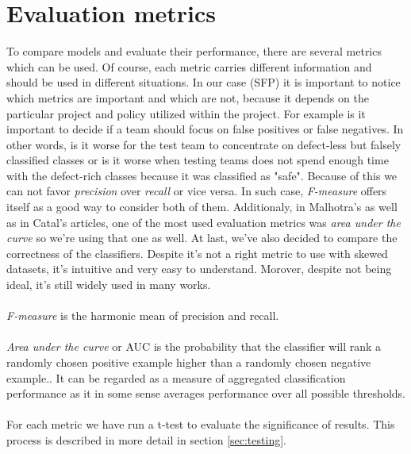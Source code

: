 \section{Evaluation metrics}
To compare models and evaluate their performance, there are several metrics which can be used. Of course, each metric carries different information and should be used in different situations. In our case (SFP) it is important to notice which metrics are important and which are not, because it depends on the particular project and policy utilized within the project.
For example is it important to decide if a team should focus on false positives or false negatives. In other words, is it worse for the test team to concentrate on defect-less but falsely classified classes or is it worse when testing teams does not spend enough time with the defect-rich classes because it was classified as "safe". Because of this we can not favor \textit{precision} over \textit{recall} or vice versa. In such case, \textit{F-measure} offers itself as a good way to consider both of them. Additionaly, in Malhotra's \cite{malhotra2015systematic} as well as in Catal's\cite{catal2012performance} articles, one of the most used evaluation metrics was \textit{area under the curve} so we're using that one as well. At last, we've also decided to compare the correctness of the classifiers. Despite it's not a right metric to use\cite{sankar2014prediction,catal2012performance} with skewed datasets, it's intuitive and very easy to understand. Morover, despite not being ideal, it's still widely used in many works\cite{sahana2013software,prasad2015study,sharma2016software}. \\\\
\textit{F-measure} is the harmonic mean of precision and recall.\cite{malhotra2015systematic}\\\\
\textit{Area under the curve} or AUC is the probability that the classifier will rank a randomly chosen positive example higher than a randomly chosen negative example.\cite{japkowicz2011evaluating}. It can be regarded as a measure of aggregated classification performance as it in some sense averages performance over all possible thresholds\cite{dejaeger2013toward}. \\\\
For each metric we have run a t-test to evaluate the significance of results. This process is described in more detail in section \ref{sec:testing}. 